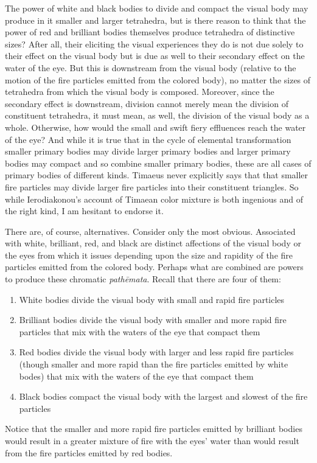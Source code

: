 The power of white and black bodies to divide and compact the visual body may produce in it smaller and larger tetrahedra, but is there reason to think that the power of red and brilliant bodies themselves produce tetrahedra of distinctive sizes? After all, their eliciting the visual experiences they do is not due solely to their effect on the visual body but is due as well to their secondary effect on the water of the eye. But this is downstream from the visual body (relative to the motion of the fire particles emitted from the colored body), no matter the sizes of tetrahedra from which the visual body is composed. Moreover, since the secondary effect is downstream, division cannot merely mean the division of constituent tetrahedra, it must mean, as well, the division of the visual body as a whole. Otherwise, how would the small and swift fiery effluences reach the water of the eye? And while it is true that in the cycle of elemental transformation smaller primary bodies may divide larger primary bodies and larger primary bodies may compact and so combine smaller primary bodies, these are all cases of primary bodies of different kinds. Timaeus never explicitly says that that smaller fire particles may divide larger fire particles into their constituent triangles. So while Ierodiakonou's account of Timaean color mixture is both ingenious and of the right kind, I am hesitant to endorse it. 

There are, of course, alternatives. Consider only the most obvious. Associated with white, brilliant, red, and black are distinct affections of the visual body or the eyes from which it issues depending upon the size and rapidity of the fire particles emitted from the colored body. Perhaps what are combined are powers to produce these chromatic \emph{pathēmata}. Recall that there are four of them:
\begin{enumerate}
	\item White bodies divide the visual body with small and rapid fire particles
	\item Brilliant bodies divide the visual body with smaller and more rapid fire particles that mix with the waters of the eye that compact them 
	\item Red bodies divide the visual body with larger and less rapid fire particles (though smaller and more rapid than the fire particles emitted by white bodes) that mix with the waters of the eye that compact them
	\item Black bodies compact the visual body with the largest and slowest of the fire particles
\end{enumerate}
Notice that the smaller and more rapid fire particles emitted by brilliant bodies would result in a greater mixture of fire with the eyes' water than would result from the fire particles emitted by red bodies.

